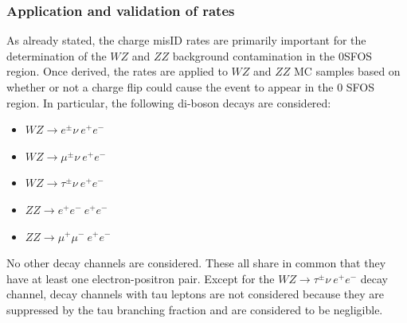 \subsubsection{Application and validation of rates}
As already stated, the charge misID rates are primarily important for the determination of the $WZ$ and $ZZ$ background contamination in the 0SFOS region. 
Once derived, the rates are applied to $WZ$ and $ZZ$ MC samples based on whether or not a charge flip could cause the event to appear in the 0 SFOS region.  
In particular, the following di-boson decays are considered:
\begin{itemize}
\item $WZ\rightarrow e^{\pm}\nu~ e^{+}e^{-}$
\item $WZ\rightarrow \mu^{\pm}\nu~ e^{+}e^{-}$
\item $WZ\rightarrow \tau^{\pm}\nu~ e^{+}e^{-}$
\item $ZZ\rightarrow e^{+}e^{-}~e^{+}e^{-}$
\item $ZZ\rightarrow \mu^{+}\mu^{-}~ e^{+}e^{-}$
\end{itemize}
No other decay channels are considered.  These all share in common that they have at least one electron-positron pair.  
Except for the $WZ\rightarrow \tau^{\pm}\nu~e^{+}e^{-}$ decay channel, decay channels with tau leptons are not considered
because they are suppressed by the tau branching fraction and are considered to be negligible.

